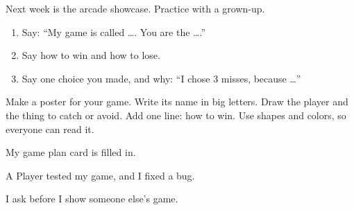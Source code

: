 
\begin{playathome}
Next week is the arcade showcase. Practice with a grown-up.
\begin{enumerate}[leftmargin=1.4em,itemsep=2pt]
  \item Say: \enquote{My game is called \ldots. You are the \ldots.}
  \item Say how to win and how to lose.
  \item Say one choice you made, and why: \enquote{I chose 3 misses, because \ldots}
\end{enumerate}
\end{playathome}

\begin{playathome}
Make a poster for your game. Write its name in big letters. Draw the player and the thing to catch or avoid. Add one line: how to win. Use shapes and colors, so everyone can read it.
\end{playathome}

\begin{selfcheck}
  \item My game plan card is filled in.
  \item A Player tested my game, and I fixed a bug.
  \item I ask before I show someone else's game.
\end{selfcheck}
